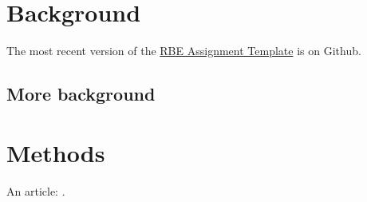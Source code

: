 \documentclass{RBEassignment}
\begin{document}
\RBEassignmentheader[title=RBE Example,
                     author=Daniel Montrallo Flickinger PhD,
                     course=RBE-000 Generic RBE Course,
                     number=0,
                     due=today]{}




\section{Background}


The most recent version of the \href{https://github.com/dmflickinger/RBE550-assignment-template}{RBE Assignment Template} is on Github.  

\lipsum[2]

\subsection{More background}

\lipsum[3]

\section{Methods}

\lipsum[4]

An article: \cite{WSJrobotRescue}.






\printurls
\end{document}
